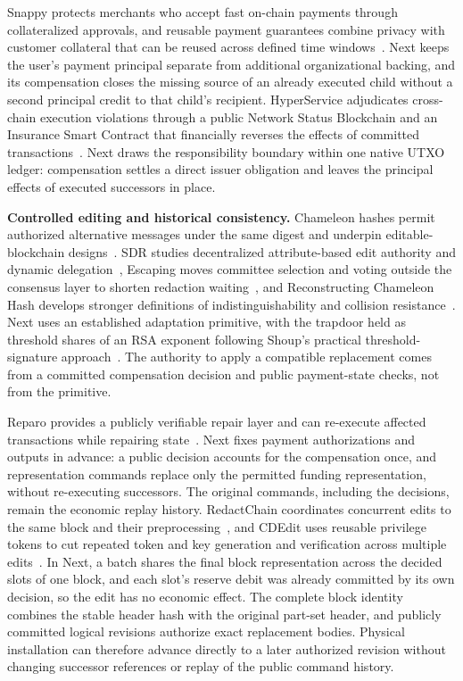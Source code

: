 Snappy protects merchants who accept fast on-chain payments through
collateralized approvals, and reusable payment guarantees combine privacy with
customer collateral that can be reused across defined time
windows~\cite{snappy,reusable}. Next keeps the user's payment principal
separate from additional organizational backing, and its compensation closes
the missing source of an already executed child without a second principal
credit to that child's recipient. HyperService adjudicates cross-chain
execution violations through a public Network Status Blockchain and an
Insurance Smart Contract that financially reverses the effects of committed
transactions~\cite{web3}. Next draws the responsibility boundary within one
native UTXO ledger: compensation settles a direct issuer obligation and leaves
the principal effects of executed successors in place.

\noindent\textbf{Controlled editing and historical consistency.}
Chameleon hashes permit authorized alternative messages under the same digest
and underpin editable-blockchain designs~\cite{redactable}. SDR studies
decentralized attribute-based edit authority and dynamic
delegation~\cite{sdr}, Escaping moves committee selection and voting outside
the consensus layer to shorten redaction waiting~\cite{escaping}, and
Reconstructing Chameleon Hash develops stronger definitions of
indistinguishability and collision resistance~\cite{reconstructCH}. Next uses
an established adaptation primitive, with the trapdoor held as threshold
shares of an RSA exponent following Shoup's practical threshold-signature
approach~\cite{shoup}. The authority to apply a compatible replacement comes
from a committed compensation decision and public payment-state checks, not
from the primitive.

Reparo provides a publicly verifiable repair layer and can re-execute affected
transactions while repairing state~\cite{reparo}. Next fixes payment
authorizations and outputs in advance: a public decision accounts for the
compensation once, and representation commands replace only the permitted
funding representation, without re-executing successors. The original
commands, including the decisions, remain the economic replay history.
RedactChain coordinates concurrent edits to the same block and their
preprocessing~\cite{redactchain}, and CDEdit uses reusable privilege tokens to
cut repeated token and key generation and verification across multiple
edits~\cite{cdedit}. In Next, a batch shares the final block representation
across the decided slots of one block, and each slot's reserve debit was
already committed by its own decision, so the edit has no economic effect. The
complete block identity combines the stable header hash with the original
part-set header, and publicly committed logical revisions authorize exact
replacement bodies. Physical installation can therefore advance directly to a
later authorized revision without changing successor references or replay of
the public command history.
